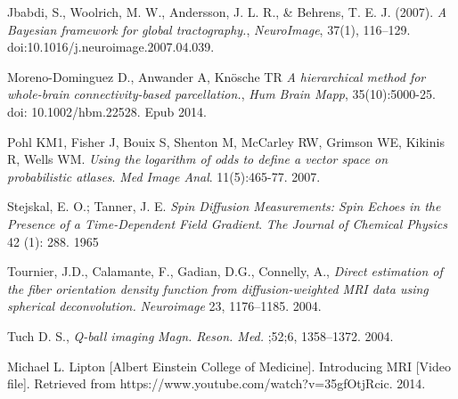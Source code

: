 \begin{thebibliography}{9}
 Jbabdi, S., Woolrich, M. W., Andersson, J. L. R., \& Behrens, T. E. J. (2007). \emph{A Bayesian framework for global tractography.}, \textit{NeuroImage}, 37(1), 116–129. doi:10.1016/j.neuroimage.2007.04.039.

 Moreno-Dominguez D., Anwander A, Knösche TR \emph{A hierarchical method for whole-brain connectivity-based parcellation.}, \textit{Hum Brain Mapp}, 35(10):5000-25. doi: 10.1002/hbm.22528. Epub 2014.

 Pohl KM1, Fisher J, Bouix S, Shenton M, McCarley RW, Grimson WE, Kikinis R, Wells WM. \emph{Using the logarithm of odds to define a vector space on probabilistic atlases}. \textit{Med Image Anal}. 11(5):465-77. 2007.

 Stejskal, E. O.; Tanner, J. E. \emph{Spin Diffusion Measurements: Spin Echoes in the Presence of a Time-Dependent Field Gradient}. \textit{The Journal of Chemical Physics} 42 (1): 288. 1965

 Tournier, J.D., Calamante, F., Gadian, D.G., Connelly, A., \emph{Direct estimation of the fiber orientation density function from diffusion-weighted MRI data using spherical deconvolution.} \textit{Neuroimage} 23, 1176–1185. 2004.

 Tuch D. S., \emph{Q-ball  imaging} \textit{Magn. Reson. Med.} ;52;6, 1358–1372. 2004.

 Michael L. Lipton [Albert Einstein College of Medicine]. Introducing MRI [Video file]. Retrieved from https://www.youtube.com/watch?v=35gfOtjRcic. 2014. 




\end{thebibliography}


